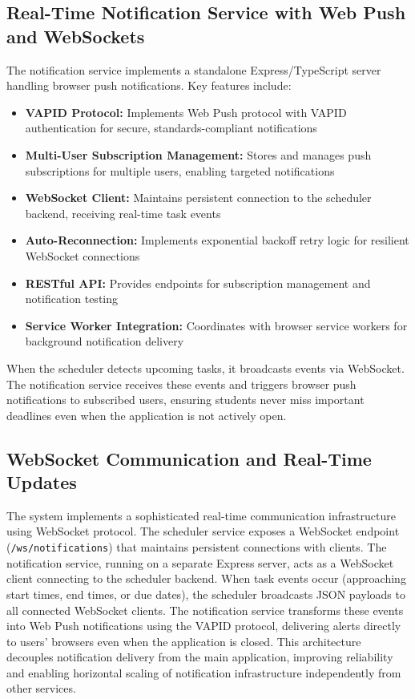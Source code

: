 \documentclass[conference]{IEEEtran}
\begin{document}
\subsection{Real-Time Notification Service with Web Push and WebSockets}
The notification service implements a standalone Express/TypeScript server handling browser push notifications. Key features include:
\begin{itemize}
    \item \textbf{VAPID Protocol:} Implements Web Push protocol with VAPID authentication for secure, standards-compliant notifications
    \item \textbf{Multi-User Subscription Management:} Stores and manages push subscriptions for multiple users, enabling targeted notifications
    \item \textbf{WebSocket Client:} Maintains persistent connection to the scheduler backend, receiving real-time task events
    \item \textbf{Auto-Reconnection:} Implements exponential backoff retry logic for resilient WebSocket connections
    \item \textbf{RESTful API:} Provides endpoints for subscription management and notification testing
    \item \textbf{Service Worker Integration:} Coordinates with browser service workers for background notification delivery
\end{itemize}

When the scheduler detects upcoming tasks, it broadcasts events via WebSocket. The notification service receives these events and triggers browser push notifications to subscribed users, ensuring students never miss important deadlines even when the application is not actively open.

\subsection{WebSocket Communication and Real-Time Updates}
The system implements a sophisticated real-time communication infrastructure using WebSocket protocol. The scheduler service exposes a WebSocket endpoint (\texttt{/ws/notifications}) that maintains persistent connections with clients. The notification service, running on a separate Express server, acts as a WebSocket client connecting to the scheduler backend. When task events occur (approaching start times, end times, or due dates), the scheduler broadcasts JSON payloads to all connected WebSocket clients. The notification service transforms these events into Web Push notifications using the VAPID protocol, delivering alerts directly to users' browsers even when the application is closed. This architecture decouples notification delivery from the main application, improving reliability and enabling horizontal scaling of notification infrastructure independently from other services.
\end{document}
